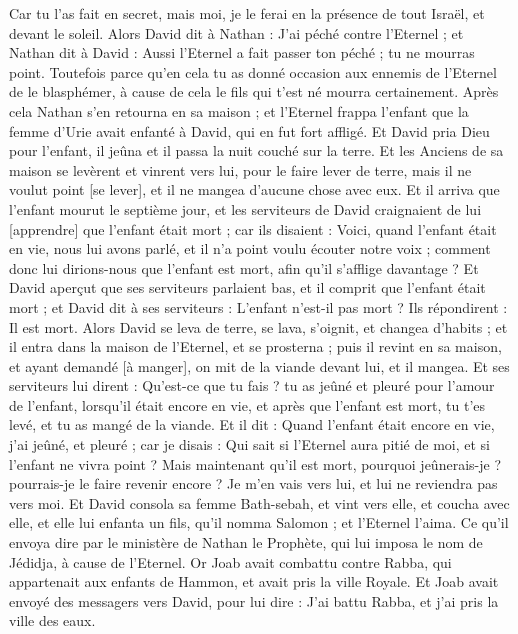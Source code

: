 \begin{multicols}{2}
Car tu l'as fait en secret, mais moi, je le ferai en la présence de tout Israël, et devant le soleil.
Alors David dit à Nathan : J'ai péché contre l'Eternel ; et Nathan dit à David : Aussi l'Eternel a fait passer ton péché ; tu ne mourras point.
Toutefois parce qu'en cela tu as donné occasion aux ennemis de l'Eternel de le blasphémer, à cause de cela le fils qui t'est né mourra certainement.
Après cela Nathan s'en retourna en sa maison ; et l'Eternel frappa l'enfant que la femme d'Urie avait enfanté à David, qui en fut fort affligé.
Et David pria Dieu pour l'enfant, il jeûna et il passa la nuit couché sur la terre.
Et les Anciens de sa maison se levèrent et vinrent vers lui, pour le faire lever de terre, mais il ne voulut point [se lever], et il ne mangea d'aucune chose avec eux.
Et il arriva que l'enfant mourut le septième jour, et les serviteurs de David craignaient de lui [apprendre] que l'enfant était mort ; car ils disaient : Voici, quand l'enfant était en vie, nous lui avons parlé, et il n'a point voulu écouter notre voix ; comment donc lui dirions-nous que l'enfant est mort, afin qu'il s'afflige davantage ?
Et David aperçut que ses serviteurs parlaient bas, et il comprit que l'enfant était mort ; et David dit à ses serviteurs : L'enfant n'est-il pas mort ? Ils répondirent : Il est mort.
Alors David se leva de terre, se lava, s'oignit, et changea d'habits ; et il entra dans la maison de l'Eternel, et se prosterna ; puis il revint en sa maison, et ayant demandé [à manger], on mit de la viande devant lui, et il mangea.
Et ses serviteurs lui dirent : Qu'est-ce que tu fais ? tu as jeûné et pleuré pour l'amour de l'enfant, lorsqu'il était encore en vie, et après que l'enfant est mort, tu t'es levé, et tu as mangé de la viande.
Et il dit : Quand l'enfant était encore en vie, j'ai jeûné, et pleuré ; car je disais : Qui sait si l'Eternel aura pitié de moi, et si l'enfant ne vivra point ?
Mais maintenant qu'il est mort, pourquoi jeûnerais-je ? pourrais-je le faire revenir encore ? Je m'en vais vers lui, et lui ne reviendra pas vers moi.
Et David consola sa femme Bath-sebah, et vint vers elle, et coucha avec elle, et elle lui enfanta un fils, qu'il nomma Salomon ; et l'Eternel l'aima.
Ce qu'il envoya dire par le ministère de Nathan le Prophète, qui lui imposa le nom de Jédidja, à cause de l'Eternel.
Or Joab avait combattu contre Rabba, qui appartenait aux enfants de Hammon, et avait pris la ville Royale.
Et Joab avait envoyé des messagers vers David, pour lui dire : J'ai battu Rabba, et j'ai pris la ville des eaux.

\end{multicols}
